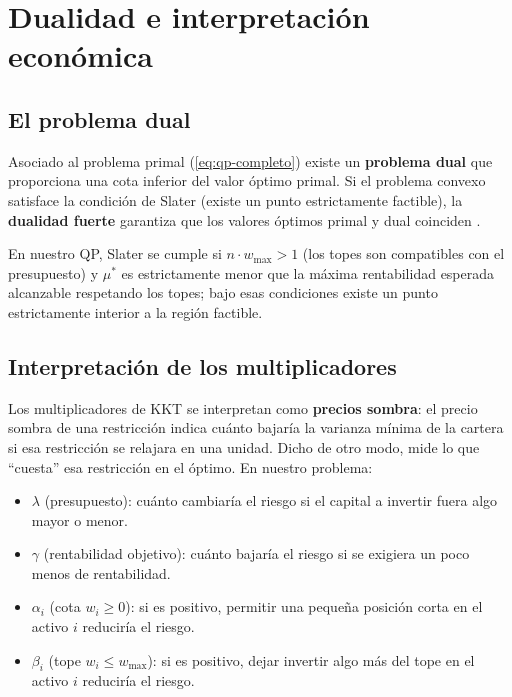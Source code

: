 \section{Dualidad e interpretación económica}
\label{sec:dualidad}

\subsection{El problema dual}

Asociado al problema primal (\ref{eq:qp-completo}) existe un
\textbf{problema dual} que proporciona una cota inferior del valor
óptimo primal. Si el problema convexo satisface la condición de Slater (existe un punto
estrictamente factible), la \textbf{dualidad fuerte} garantiza que los valores
óptimos primal y dual coinciden \cite{Boyd2004}.

En nuestro QP, Slater se cumple si $n \cdot w_{\max} > 1$ (los topes son
compatibles con el presupuesto) y $\mu^*$ es estrictamente menor que la máxima
rentabilidad esperada alcanzable respetando los topes; bajo esas condiciones
existe un punto estrictamente interior a la región factible.

\subsection{Interpretación de los multiplicadores}

Los multiplicadores de KKT se interpretan como \textbf{precios sombra}: el
precio sombra de una restricción indica cuánto bajaría la varianza mínima de la
cartera si esa restricción se relajara en una unidad. Dicho de otro modo, mide
lo que ``cuesta'' esa restricción en el óptimo. En nuestro problema:
\begin{itemize}
    \item $\lambda$ (presupuesto): cuánto cambiaría el riesgo si el capital a
          invertir fuera algo mayor o menor.
    \item $\gamma$ (rentabilidad objetivo): cuánto bajaría el riesgo si se
          exigiera un poco menos de rentabilidad.
    \item $\alpha_i$ (cota $w_i \ge 0$): si es positivo, permitir una pequeña
          posición corta en el activo $i$ reduciría el riesgo.
    \item $\beta_i$ (tope $w_i \le w_{\max}$): si es positivo, dejar invertir
          algo más del tope en el activo $i$ reduciría el riesgo.
\end{itemize}

